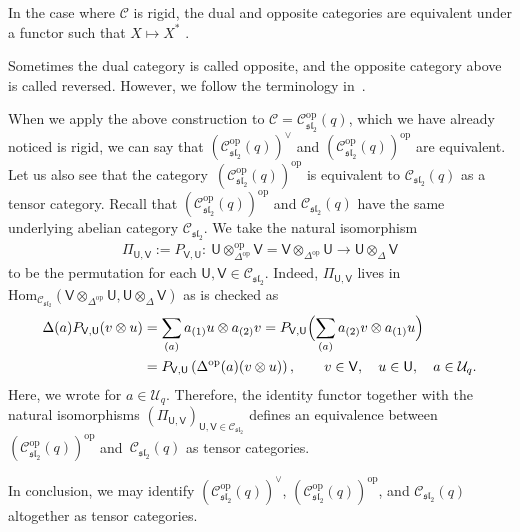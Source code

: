 \documentclass[pdftex]{sigma}
\numberwithin{equation}{section}
\newcommand{\Hom}{\mathrm{Hom}}
\newcommand{\Id}{\operatorname{Id}}
\newcommand{\op}{\mathrm{op}}
\newcommand{\cC}{\mathcal{C}}
\newcommand{\cU}{\mathcal{U}}
\newcommand{\fsl}{\mathfrak{sl}}
\newcommand{\sfU}{\mathsf{U}}
\newcommand{\sfV}{\mathsf{V}}
\newcommand{\UEA}{\cU}
\newcommand{\Uq}{\UEA_{q}}
\newcommand{\QGcoprod}{\Delta}
\newcommand{\catQG}{\cC_{\fsl_{2}}}
\newcommand{\catgen}{\cC}
\newcommand{\QGrepU}{\sfU}
\newcommand{\QGrepV}{\sfV}
\begin{document}
In the case where $\catgen$ is rigid, the dual and opposite categories are equivalent under a functor such that $X\mapsto X^{*}$ \cite[Chapter 2]{etingof2015tensor}.

\begin{rem}
Sometimes the dual category is called opposite, and the opposite category above is called reversed.
However, we follow the terminology in~\cite{etingof2015tensor}.
\end{rem}

When we apply the above construction to $\catgen=\catQG^{\op}(q)$, which we have already noticed is rigid, we can say that $(\catQG^{\op}(q))^{\vee}$ and $(\catQG^{\op}(q))^{\op}$ are equivalent.
Let us also see that the category~$(\catQG^{\op}(q))^{\op}$ is equivalent to $\catQG (q)$ as a tensor category.
Recall that $(\catQG^{\op}(q))^{\op}$ and $\catQG(q)$ have the same underlying abelian category $\catQG$.
We take the natural isomorphism
\begin{gather*}
 \Pi_{\QGrepU,\QGrepV}:=P_{\QGrepV,\QGrepU}\colon\ \QGrepU\otimes_{\QGcoprod^{\op}}^{\op}\QGrepV= \QGrepV\otimes_{\QGcoprod^{\op}}\QGrepU\to \QGrepU\otimes_{\QGcoprod}\QGrepV
\end{gather*}
to be the permutation for each $\QGrepU,\QGrepV\in \catQG$.
Indeed, $\Pi_{\QGrepU,\QGrepV}$ lives in $\Hom_{\catQG}(\QGrepV\otimes_{\QGcoprod^{\op}}\QGrepU,\QGrepU\otimes_{\QGcoprod}\QGrepV)$ as is checked as
\begin{align*}
 \QGcoprod (a)P_{\QGrepV,\QGrepU}(v\otimes u)&=\sum_{(a)}a_{(1)}u\otimes a_{(2)}v =P_{\QGrepV,\QGrepU}\Bigl(\sum_{(a)}a_{(2)}v\otimes a_{(1)}u\Bigr) \\
 &=P_{\QGrepV,\QGrepU}\left(\QGcoprod^{\op}(a)(v\otimes u)\right),\qquad v\in \QGrepV,\quad u\in \QGrepU,\quad a\in \Uq.
\end{align*}
Here, we wrote \smash{$\QGcoprod (a)=\sum_{(a)}a_{(1)}\otimes a_{(2)}$} for $a\in \Uq$.
Therefore, the identity functor \smash{$\Id_{\catQG}$} together with the natural isomorphisms $(\Pi_{\QGrepU,\QGrepV})_{\QGrepU,\QGrepV\in \catQG}$ defines an equivalence between $(\catQG^{\op}(q))^{\op}$ and~$\catQG (q)$ as tensor categories.

In conclusion, we may identify $(\catQG^{\op}(q))^{\vee}$, $(\catQG^{\op}(q))^{\op}$, and $\catQG(q)$ altogether as tensor categories.
\end{document}
